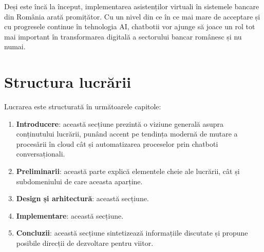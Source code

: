 Deși este încă la început, implementarea asistenților virtuali în sistemele bancare din România arată promițător. Cu un nivel din ce în ce mai mare de acceptare și cu progresele continue în tehnologia AI, chatbotii vor ajunge să joace un rol tot mai important în transformarea digitală a sectorului bancar românesc și nu numai.

\section{Structura lucrării}

Lucrarea este structurată în următoarele capitole:

\begin{enumerate}
    \item \textbf{Introducere}: această secțiune prezintă o viziune generală asupra conținutului lucrării, punând accent pe tendința modernă de mutare a procesării în cloud cât și automatizarea proceselor prin chatboti conversaționali.
    \item \textbf{Preliminarii}: această parte explică elementele cheie ale lucrării, cât și subdomeniului de care aceasta aparține.
    \item \textbf{Design și arhitectură}: această secțiune.
    \item \textbf{Implementare}: această secțiune.
    \item \textbf{Concluzii}: această secțiune sintetizează informațiile discutate și propune posibile direcții de dezvoltare pentru viitor.
\end{enumerate}